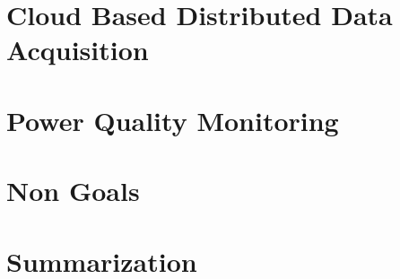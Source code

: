 
\section{Cloud Based Distributed Data Acquisition}

\section{Power Quality Monitoring}

\section{Non Goals}

\section{Summarization}